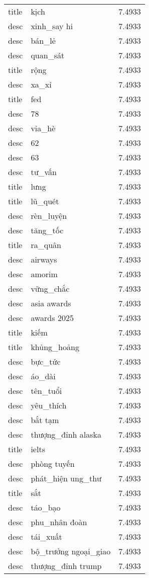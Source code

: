 \documentclass{article}
\begin{document}
\begin{tabular}{lll}
title & kịch & 7.4933\\
desc & xinh\_say hi & 7.4933\\
desc & bán\_lẻ & 7.4933\\
desc & quan\_sát & 7.4933\\
title & rộng & 7.4933\\
desc & xa\_xỉ & 7.4933\\
title & fed & 7.4933\\
desc & 78 & 7.4933\\
desc & vỉa\_hè & 7.4933\\
desc & 62 & 7.4933\\
desc & 63 & 7.4933\\
desc & tư\_vấn & 7.4933\\
title & lưng & 7.4933\\
title & lũ\_quét & 7.4933\\
desc & rèn\_luyện & 7.4933\\
desc & tăng\_tốc & 7.4933\\
title & ra\_quân & 7.4933\\
desc & airways & 7.4933\\
desc & amorim & 7.4933\\
desc & vững\_chắc & 7.4933\\
desc & asia awards & 7.4933\\
desc & awards 2025 & 7.4933\\
title & kiếm & 7.4933\\
title & khủng\_hoảng & 7.4933\\
desc & bực\_tức & 7.4933\\
desc & áo\_dài & 7.4933\\
desc & tên\_tuổi & 7.4933\\
desc & yêu\_thích & 7.4933\\
desc & bắt tạm & 7.4933\\
desc & thượng\_đỉnh alaska & 7.4933\\
title & ielts & 7.4933\\
desc & phòng tuyến & 7.4933\\
desc & phát\_hiện ung\_thư & 7.4933\\
title & sắt & 7.4933\\
desc & táo\_bạo & 7.4933\\
desc & phu\_nhân đoàn & 7.4933\\
desc & tái\_xuất & 7.4933\\
desc & bộ\_trưởng ngoại\_giao & 7.4933\\
desc & thượng\_đỉnh trump & 7.4933\\

\end{tabular}
\end{document}
